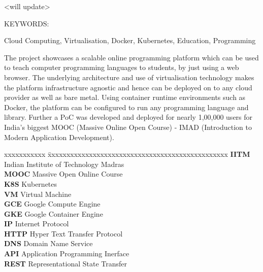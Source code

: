\documentclass[DD]{iitmdiss}
\begin{document}
\acknowledgements

<will update>


\abstract

\noindent KEYWORDS: \hspace*{0.5em} \parbox[t]{4.4in}{Cloud Computing, Virtualisation, Docker, Kubernetes, Education, Programming}

\vspace*{24pt}

\noindent The project showcases a scalable online programming platform which can be used to teach computer programming languages to students, by just using a web browser. The underlying architecture and use of virtualisation technology makes the platform infrastructure agnostic and hence can be deployed on to any cloud provider as well as bare metal. Using container runtime environments such as Docker, the platform can be configured to run any programming language and library. Further a PoC was developed and deployed for nearly 1,00,000 users for India's biggest MOOC (Massive Online Open Course) - IMAD (Introduction to Modern Application Development).

\pagebreak


\begin{singlespace}
\tableofcontents
\thispagestyle{empty}

\listoftables
{}
\listoffigures
{}
\end{singlespace}


\abbreviations

\noindent 
\begin{tabbing}
xxxxxxxxxxx \= xxxxxxxxxxxxxxxxxxxxxxxxxxxxxxxxxxxxxxxxxxxxxxxx \kill
\textbf{IITM}   \> Indian Institute of Technology Madras \\
\textbf{MOOC} \> Massive Open Online Course \\
\textbf{K8S} \> Kubernetes \\
\textbf{VM} \> Virtual Machine \\
\textbf{GCE} \> Google Compute Engine \\
\textbf{GKE} \> Google Container Engine \\
\textbf{IP} \> Internet Protocol \\
\textbf{HTTP} \> Hyper Text Transfer Protocol \\
\textbf{DNS} \> Domain Name Service \\
\textbf{API} \> Application Programming Inerface \\
\textbf{REST} \> Representational State Transfer \\
\end{tabbing}
\end{document}
